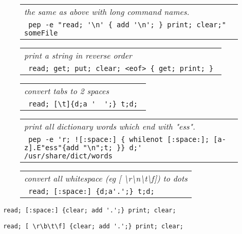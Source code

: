 \documentclass[a4paper,12pt]{article}
\begin{document}
 \begin{figure}
 \begin{tabular}{ l }
 \emph{ the same as above with long command names.  } \\ 
 \verb| pep -e "read; '\n' { add '\n'; } print; clear;" someFile |
 \end{tabular} 
 \end{figure}
 \begin{figure}
 \begin{tabular}{ l }
 \emph{ print a string in reverse order } \\ 
 \verb| read; get; put; clear; <eof> { get; print; } |
 \end{tabular} 
 \end{figure}
 \begin{figure}
 \begin{tabular}{ l }
 \emph{ convert tabs to 2 spaces  } \\ 
 \verb| read; [\t]{d;a '  ';} t;d; |
 \end{tabular} 
 \end{figure}
 \begin{figure}
 \begin{tabular}{ l }
 \emph{ print all dictionary words which end with "ess". } \\ 
 \verb| pep -e 'r; ![:space:] { whilenot [:space:]; [a-z].E"ess"{add "\n";t; }} d;' /usr/share/dict/words  |
 \end{tabular} 
 \end{figure}
 \begin{figure}
 \begin{tabular}{ l }
 \emph{ convert all whitespace (eg [ \textbackslash r\textbackslash n\textbackslash t\textbackslash f]) to dots } \\ 
 \verb| read; [:space:] {d;a'.';} t;d; |
 \end{tabular} 
 \end{figure} 
 \verb| read; [:space:] {clear; add '.';} print; clear;  |
 
 \verb| read; [ \r\b\t\f] {clear; add '.';} print; clear;  |
\end{document}
